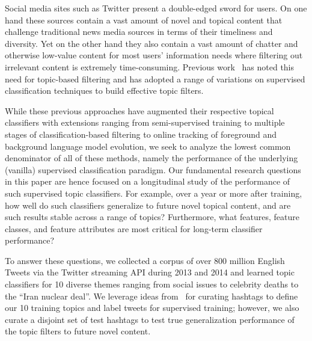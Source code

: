 
\label{sec:introduction}

Social media sites such as Twitter present a double-edged sword for
users.  On one hand these sources contain a vast amount of novel and
topical content that challenge traditional news media sources in terms
of their timeliness and diversity.  Yet on the other hand they also
contain a vast amount of chatter and otherwise low-value content for most
users' information needs where filtering out irrelevant content is
extremely time-consuming.  Previous work~\cite{lin2011smoothing,yang2014large,magdy} 
has noted this need for topic-based filtering and has adopted a range
of variations on supervised classification techniques to build effective
topic filters.

While these previous approaches have augmented their respective topical classifiers with extensions
ranging from semi-supervised training to multiple stages of classification-based filtering to online tracking of foreground and background language model evolution, 
we seek to analyze the lowest common denominator
of all of these methods, namely the performance of the underlying (vanilla) supervised 
classification paradigm.
Our fundamental research questions in this paper are hence focused on a longitudinal study
of the performance of such supervised topic classifiers.  
For example, over a year or more after training, how well do such classifiers generalize to future novel topical content, and are such results stable across a range of topics?  Furthermore, what features, feature classes, and feature attributes are most critical for long-term classifier performance?  

To answer these questions, we collected a corpus of over 800 million English Tweets via the Twitter streaming API during 2013 and 2014 and learned topic classifiers for 10 diverse themes ranging from social issues to celebrity deaths to the ``Iran nuclear deal''.  We leverage ideas from~\cite{lin2011smoothing} for curating hashtags to define our 10 training topics and label
tweets for supervised training; however, we also curate a disjoint set of test hashtags %
to test true generalization performance of the topic filters to future novel content. 

